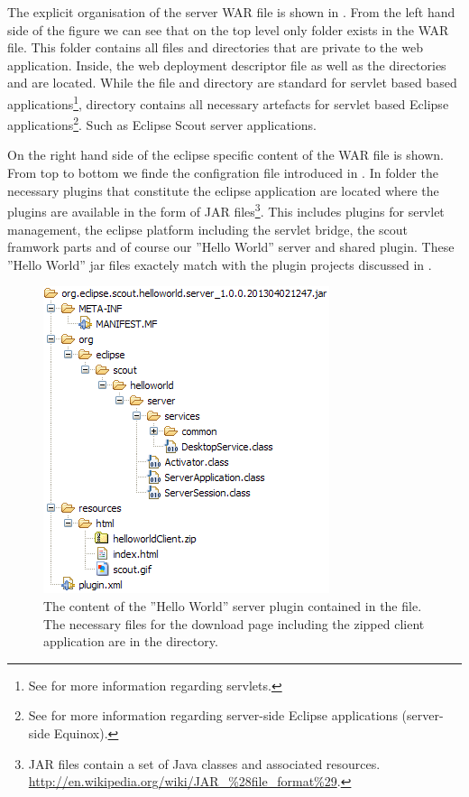 \documentclass[a4paper,10pt,twoside]{book}
\begin{document}
{The explicit organisation of the server WAR file is shown in .
From the left hand side of the figure we can see that on the top level only folder  exists in the WAR file.
This folder contains all files and directories that are private to the web application.
Inside, the web deployment descriptor file  as well as the directories  and  are located.
While the  file and directory  are standard for servlet based based applications\footnote{
See  for more information regarding servlets.
},
directory  contains all necessary artefacts for servlet based Eclipse applications\footnote{
See  for more information regarding server-side Eclipse applications (server-side Equinox). 
}.
Such as Eclipse Scout server applications.

On the right hand side of  the eclipse specific content of the WAR file is shown.
From top to bottom we finde the configration file  introduced in .
In folder  the necessary plugins that constitute the eclipse application are located where the plugins are available in the form of JAR files\footnote{
JAR files contain a set of Java classes and associated resources. \url{http://en.wikipedia.org/wiki/JAR_\%28file_format\%29}.
}.
This includes plugins for servlet management, the eclipse platform including the servlet bridge, the scout framwork parts and of course our ''Hello World'' server and shared plugin.
These ''Hello World'' jar files exactely match with the plugin projects discussed in .

\begin{figure}
\includegraphics[height=9cm]{helloworld_server_war_plugin.png} 
\caption{The content of the ''Hello World'' server plugin contained in the  file.
The necessary files for the download page including the zipped client application are in the  directory.} 
\end{figure}

}
\end{document}
